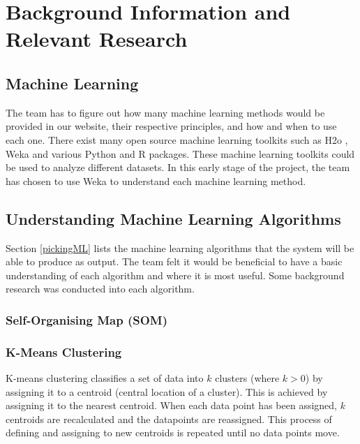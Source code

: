 \documentclass[titlepage]{article}
\begin{document}
\section{Background Information and \\Relevant Research}
\subsection{Machine Learning}
The team has to figure out how many machine learning methods would be provided in our website, their respective principles, and how and when to use each one.
There exist many open source machine learning toolkits such as H2o \cite{h2o.ai}, Weka \cite{weka} and various Python and R packages. 
These machine learning toolkits could be used to analyze different datasets. 
In this early stage of the project, the team has chosen to use Weka to understand each machine learning method.

\subsection{Understanding Machine Learning Algorithms}
Section \ref{pickingML} lists the machine learning algorithms that the system will be able to produce as output. 
The team felt it would be beneficial to have a basic understanding of each algorithm and where it is most useful. 
Some background research was conducted into each algorithm.

\subsubsection*{Self-Organising Map (SOM)}
\subsubsection*{K-Means Clustering}
K-means clustering classifies a set of data into $k$ clusters (where $k > 0$) by assigning it to a centroid (central location of a cluster). 
This is achieved by assigning it to the nearest centroid. 
When each data point has been assigned, $k$ centroids are recalculated and the datapoints are reassigned. 
This process of defining and assigning to new centroids is repeated until no data points move.\cite{kmeans}
\end{document}
